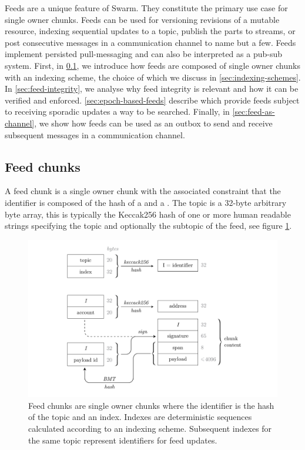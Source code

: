 \green{}

Feeds are a unique feature of Swarm. They constitute the primary use case for single owner chunks. Feeds can be used for versioning revisions of a mutable resource, indexing sequential updates to a topic, publish the parts to streams, or post consecutive messages in a communication channel to name but a few. Feeds implement persisted pull-messaging and can also be interpreted as a pub-sub system.
First, in \ref{sec:feed-chunks}, we introduce how feeds are composed of single owner chunks with an indexing scheme, the choice of which we discuss in \ref{sec:indexing-schemes}. In \ref{sec:feed-integrity}, we analyse why feed integrity is relevant and how it can be verified and enforced. \ref{sec:epoch-based-feeds} describe  which provide feeds subject to receiving sporadic updates a way to be searched. Finally, in \ref{sec:feed-as-channel}, we show how feeds can be used as an outbox to send and receive subsequent messages in a communication channel.


\subsection{Feed chunks \statusyellow}\label{sec:feed-chunks}

A feed chunk is a single owner chunk with the associated constraint that the identifier is composed of the hash of a  and a . The topic is a 32-byte arbitrary byte array, this is typically the Keccak256 hash of one or more human readable strings specifying the topic and optionally the subtopic of the feed, see figure \ref{fig:feed-chunk}. 


\begin{figure}[htbp]
\centering
\includegraphics[width=\textwidth]{fig/feed-chunk.pdf}
\caption[Feed chunk \statusgreen]{Feed chunks are single owner chunks where the identifier is the hash of the topic and an index. Indexes are deterministic sequences calculated according to an indexing scheme. Subsequent indexes for the same topic represent identifiers for feed updates.}
\label{fig:feed-chunk}
\end{figure}

